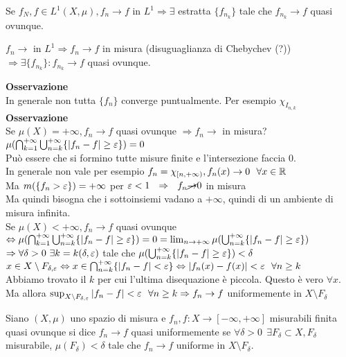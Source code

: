 \documentclass[12px]{article}
\begin{document}
	\begin{coro}
		Se $f_N, f\in L^1(X,\mu), f_n \rightarrow f$ in $L^1 \Rightarrow \exists$ estratta $\{f_{n_k}\}$ tale che $f_{n_k} \rightarrow f$ quasi ovunque.
	\end{coro}
	\begin{dimo}
		$f_n \rightarrow$ in $L^1 \Rightarrow  f_n \rightarrow f $ in misura \hfill (disuguaglianza di Chebychev (?))\\
		$ \Rightarrow  \exists \{f_{n_k}\}: f_{n_k} \rightarrow f$ quasi ovunque.
	\end{dimo}
	\textbf{Osservazione}\\
	In generale non tutta $\{f_n\}$ converge puntualmente. Per esempio  $\chi_{I_{n,k}}$\\
	 \textbf{Osservazione}\\
	 Se $\mu(X) = +\infty, f_n \rightarrow f$ quasi ovunque  $ \Rightarrow  f_n \rightarrow $ in misura?\\
	 $\mu( \bigcap^{+\infty}_{k= 1} \bigcup^{+\infty}_{n = k}\{|f_n-f|\geq\varepsilon\}) =0$\\
Può essere che si formino tutte misure finite e l'intersezione faccia $0$.\\
In generale non vale per esempio  $f_n = \chi_{[n,+\infty)}, f_n(x) \rightarrow 0 \ \ \forall x\in \mathbb{R}$\\
Ma $m(\{f_n>\varepsilon\}) = +\infty$ per  $\varepsilon < 1\ \ \Rightarrow  \ \ f_n \cancel \rightarrow 0 $ in misura\\
Ma quindi bisogna che i sottoinsiemi vadano a $+\infty$, quindi di un ambiente di misura infinita.\\
Se  $\mu(X)< +\infty, f_n \rightarrow f$  quasi ovunque $ \Leftrightarrow \mu( \bigcap^{+\infty}_{k = 1} \bigcup^{+\infty}_{n = k}\{|f_n-f|\geq\varepsilon\}) = 0 = \lim_{ n \rightarrow +\infty} \mu ( \bigcup^{+\infty}_{n = k}\{|f_n-f|\geq\varepsilon\})$\\
$ \Rightarrow  \forall \delta > 0 \ \exists k = k(\delta, \varepsilon)$ tale che $\mu ( \bigcup^{+\infty}_{n = k}\{|f_n-f|\geq\varepsilon\})<\delta$\\
$x\in X\setminus F_{\delta, \varepsilon} \Leftrightarrow x\in \bigcap^{+\infty}_{n=k}\{|f_n-f|<\varepsilon\} \Leftrightarrow |f_n(x)-f(x)| < \varepsilon \ \ \forall n\geq k$\\
Abbiamo trovato il $k$ per cui l'ultima disequazione è piccola. Questo è vero $\forall x$. Ma allora  $\sup_{X\setminus F_{\delta,\varepsilon}}|f_n-f| < \varepsilon \ \ \forall n\geq k \Rightarrow  f_n \rightarrow f$ uniformemente in $X\setminus F_\delta$ 
\begin{defi}
	Siano $(X,\mu)$ uno spazio di misura  e  $f_n , f: X \rightarrow [-\infty, +\infty]$ misurabili finita quasi ovunque si dice $f_n \rightarrow f$ quasi uniformemente se $\forall \delta > 0 \ \ \exists F_\delta \subset X, F_\delta$ misurabile,  $\mu(F_\delta) < \delta$ tale che  $f_n \rightarrow f$ uniforme in $X\setminus F_\delta$.
\end{defi}
\end{document}
